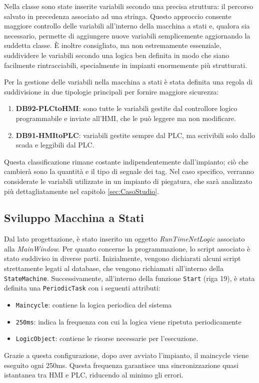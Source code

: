 Nella classe sono state inserite variabili secondo una precisa struttura: il percorso salvato in precedenza associato ad una stringa. Questo approccio consente maggiore controllo delle variabili all'interno della macchina a stati e, qualora sia necessario, permette di aggiungere nuove variabili semplicemente aggiornando la suddetta classe. È inoltre consigliato, ma non estremamente essenziale, suddividere le variabili secondo una logica ben definita in modo che siano facilmente rintracciabili, specialmente in impianti enormemente più strutturati.

Per la gestione delle variabili nella macchina a stati è stata definita una regola di suddivisione in due tipologie principali per fornire maggiore sicurezza:
\begin{enumerate}
    \item \textbf{DB92-PLCtoHMI}: sono tutte le variabili gestite dal controllore logico programmabile e inviate all'HMI, che le può leggere ma non modificare.
    \item \textbf{DB91-HMItoPLC}: variabili gestite sempre dal PLC, ma scrivibili solo dallo scada e leggibili dal PLC.
\end{enumerate}
Questa classificazione rimane costante indipendentemente dall'impianto; ciò che cambierà sono la quantità e il tipo di segnale dei tag. Nel caso specifico, verranno considerate le variabili utilizzate in un impianto di piegatura, che sarà analizzato più dettagliatamente nel capitolo \ref{sec:CasoStudio}. 

\subsection{Sviluppo Macchina a Stati}

 Dal lato progettazione, è stato inserito un oggetto \textit{RunTimeNetLogic} associato alla \textit{MainWindow}. Per quanto concerne la programmazione, lo script associato è stato suddiviso in diverse parti. Inizialmente, vengono dichiarati alcuni script strettamente legati al database, che vengono richiamati all'interno della \verb|StateMachine|. Successivamente, all'interno della funzione \verb|Start| (riga 19), è stata definita una \verb|PeriodicTask| con i seguenti attributi: 
 \begin{itemize}
     \item \verb|Maincycle|: contiene la logica periodica del sistema
     \item \verb|250ms|: indica la frequenza con cui la logica viene ripetuta periodicamente 
     \item \verb|LogicObject|: contiene le risorse necessarie per l'esecuzione.
 \end{itemize}
Grazie a questa configurazione, dopo aver avviato l'impianto, il maincycle viene eseguito ogni 250ms. Questa frequenza garantisce una sincronizzazione quasi istantanea tra HMI e PLC, riducendo al minimo gli errori.

